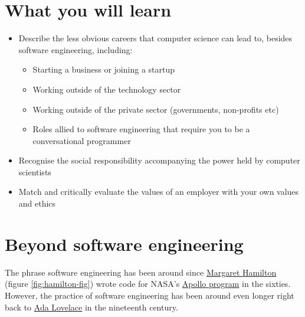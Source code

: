 \documentclass[
]{book}
\providecommand{\tightlist}{%
  \setlength{\itemsep}{0pt}\setlength{\parskip}{0pt}}
\begin{document}
\hypertarget{ilo11}{%
\section{What you will learn}\label{ilo11}}

\begin{itemize}
\tightlist
\item
  Describe the less obvious careers that computer science can lead to, besides software engineering, including:

  \begin{itemize}
  \tightlist
  \item
    Starting a business or joining a startup
  \item
    Working outside of the technology sector
  \item
    Working outside of the private sector (governments, non-profits etc)
  \item
    Roles allied to software engineering that require you to be a conversational programmer
  \end{itemize}
\item
  Recognise the social responsibility accompanying the power held by computer scientists
\item
  Match and critically evaluate the values of an employer with your own values and ethics
\end{itemize}

\hypertarget{otheroles}{%
\section{Beyond software engineering}\label{otheroles}}

The phrase software engineering has been around since \href{https://en.wikipedia.org/wiki/Margaret_Hamilton_(software_engineer)}{Margaret Hamilton} (figure \ref{fig:hamilton-fig}) wrote code for NASA's \href{https://en.wikipedia.org/wiki/Apollo_program}{Apollo program} in the sixties. However, the practice of software engineering has been around even longer right back to \href{https://en.wikipedia.org/wiki/Ada_Lovelace}{Ada Lovelace} in the nineteenth century.
\end{document}
